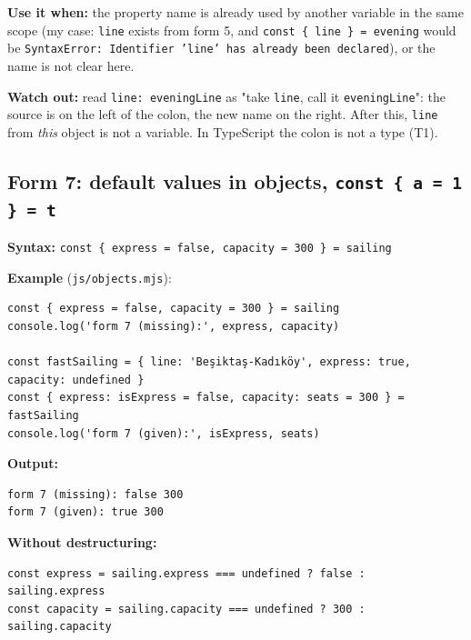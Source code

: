 \documentclass[
  10pt,
]{article}
\begin{document}
\textbf{Use it when:} the property name is already used by another
variable in the same scope (my case: \texttt{line} exists from form 5,
and \texttt{const \{ line \} =\allowbreak{} evening} would be
\texttt{SyntaxError:\allowbreak{} Identifier 'line' has already been declared}),
or the name is not clear here.

\textbf{Watch out:} read \texttt{line:\allowbreak{} eveningLine} as
"take \texttt{line}, call it \texttt{eveningLine}": the source is on the
left of the colon, the new name on the right. After this, \texttt{line}
from \emph{this} object is not a variable. In TypeScript the colon is
not a type (T1).

\hypertarget{form-7-default-values-in-objects-const--a--1---t}{%
\subsection{\texorpdfstring{Form 7: default values in objects,
\texttt{const \{ a =\allowbreak{} 1 \} =\allowbreak{} t}}{Form 7: default values in objects, }}\label{form-7-default-values-in-objects-const--a--1---t}}

\textbf{Syntax:}
\texttt{const \{ express =\allowbreak{} false,\allowbreak{} capacity =\allowbreak{} 300 \} =\allowbreak{} sailing}

\textbf{Example} (\texttt{js/\allowbreak{}objects.\allowbreak{}mjs}):

\begin{verbatim}
const { express = false, capacity = 300 } = sailing
console.log('form 7 (missing):', express, capacity)

const fastSailing = { line: 'Beşiktaş-Kadıköy', express: true, capacity: undefined }
const { express: isExpress = false, capacity: seats = 300 } = fastSailing
console.log('form 7 (given):', isExpress, seats)
\end{verbatim}

\textbf{Output:}

\begin{verbatim}
form 7 (missing): false 300
form 7 (given): true 300
\end{verbatim}

\textbf{Without destructuring:}

\begin{verbatim}
const express = sailing.express === undefined ? false : sailing.express
const capacity = sailing.capacity === undefined ? 300 : sailing.capacity
\end{verbatim}
\end{document}
